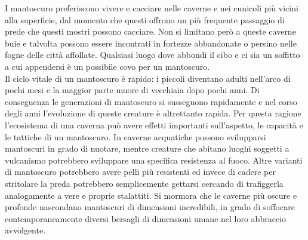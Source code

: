\begin{multicols}{2}
I mantoscuro preferiscono vivere e cacciare nelle caverne e nei cunicoli più vicini alla superficie, dal momento che questi offrono un più frequente passaggio di prede che questi mostri possono cacciare. Non si limitano però a queste caverne buie e talvolta possono essere incontrati in fortezze abbandonate o persino nelle fogne delle città affollate. Qualsiasi luogo dove abbondi il cibo e ci sia un soffitto a cui appendersi è un possibile covo per un mantoscuro.\\

Il ciclo vitale di un mantoscuro è rapido: i piccoli diventano adulti nell'arco di pochi mesi e la maggior parte muore di vecchiaia dopo pochi anni. Di conseguenza le generazioni di mantoscuro si susseguono rapidamente e nel corso degli anni l'evoluzione di queste creature è altrettanto rapida. Per questa ragione l'ecosistema di una caverna può avere effetti importanti sull'aspetto, le capacità e le tattiche di un mantoscuro. In caverne acquatiche possono svilupparsi mantoscuri in grado di nuotare, mentre creature che abitano luoghi soggetti a vulcanismo potrebbero sviluppare una specifica resistenza al fuoco. Altre varianti di mantoscuro potrebbero avere pelli più resistenti ed invece di cadere per stritolare la preda potrebbero semplicemente gettarsi cercando di trafiggerla analogamente a vere e proprie stalattiti. Si mormora che le caverne più oscure e profonde nascondano mantoscuri di dimensioni incredibili, in grado di soffocare contemporaneamente diversi bersagli di dimensioni umane nel loro abbraccio avvolgente.\\


\end{multicols}

